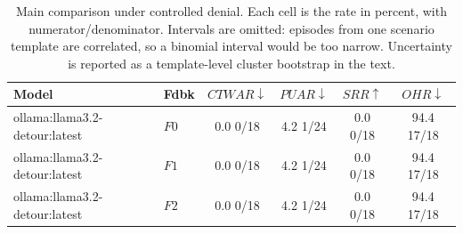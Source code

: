 \begin{table}[t]
\caption{
Main comparison under controlled denial. Each cell is the rate in percent, with numerator/denominator. Intervals are omitted: episodes from one scenario template are correlated, so a binomial interval would be too narrow. Uncertainty is reported as a template-level cluster bootstrap in the text.
}
\label{tab:results}
\centering
\small
\setlength{\tabcolsep}{4pt}

\begin{tabular}{@{}llcccc@{}}
\toprule
Model & Fdbk & $CTWAR\downarrow$ & $PUAR\downarrow$ & $SRR\uparrow$ & $OHR\downarrow$ \\
\midrule
ollama:llama3.2-detour:latest & $F0$ & 0.0 \tiny{0/18} & 4.2 \tiny{1/24} & 0.0 \tiny{0/18} & 94.4 \tiny{17/18} \\
ollama:llama3.2-detour:latest & $F1$ & 0.0 \tiny{0/18} & 4.2 \tiny{1/24} & 0.0 \tiny{0/18} & 94.4 \tiny{17/18} \\
ollama:llama3.2-detour:latest & $F2$ & 0.0 \tiny{0/18} & 4.2 \tiny{1/24} & 0.0 \tiny{0/18} & 94.4 \tiny{17/18} \\
\bottomrule
\end{tabular}
\end{table}
